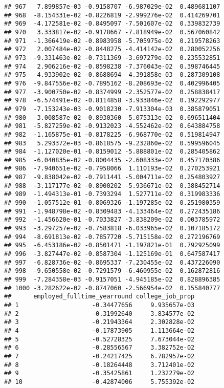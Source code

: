 \documentclass[
]{article}
\begin{document}
\begin{verbatim}
## 967   7.899857e-03 -0.9158707 -6.987029e-02  0.489681107
## 968  -8.154331e-02 -0.8226819 -2.999276e-02  0.414269701
## 969  -4.172581e-02 -0.8495097 -7.501607e-02  0.339832739
## 970   3.333817e-02 -0.9178667 -7.818949e-02  0.567060842
## 971  -1.366419e-02 -0.8983958 -5.705975e-02  0.219578263
## 972   2.007484e-02 -0.8448275 -4.414142e-02  0.280052256
## 973  -9.331463e-02 -0.7311369 -3.697279e-02  0.235532851
## 974   2.906216e-02 -0.8598238 -7.376043e-02  0.398746445
## 975  -4.933902e-02 -0.8688694  4.391858e-03  0.287309108
## 976  -9.847556e-02 -0.7895162 -8.208693e-02  0.402996405
## 977  -3.900750e-02 -0.8374999 -2.352577e-02  0.258838417
## 978  -6.574491e-02 -0.8114858 -3.933846e-02  0.192292977
## 979  -7.153243e-03 -0.9018230 -7.913304e-03  0.385879051
## 980  -3.008587e-02 -0.8930360 -5.075313e-02  0.696511404
## 981  -5.827259e-02 -0.9132023 -4.552462e-02  0.643884758
## 982  -1.165875e-01 -0.8178225 -6.968770e-02  0.519814947
## 983   5.293372e-03 -0.8618575 -9.232860e-02  0.599596045
## 984  -1.127020e-01 -0.8159012 -5.888801e-02  0.285405862
## 985  -6.040835e-02 -0.8004435 -2.608333e-02  0.457170386
## 986  -7.940651e-02 -0.7958066  1.110193e-02  0.270253921
## 987  -9.838042e-02 -0.7911441 -5.004711e-02  0.254803927
## 988  -3.117177e-02 -0.8900202 -5.936671e-02  0.388452714
## 989  -1.494313e-01 -0.7393294  1.527711e-02  0.319983336
## 990  -1.057512e-01 -0.8069326 -1.197285e-02  0.251980359
## 991  -1.948798e-02 -0.8309483 -4.133464e-02  0.272435186
## 992  -1.456620e-01 -0.7033827 -3.838209e-02  0.003785972
## 993  -3.297257e-02 -0.7583818 -6.033965e-02  0.107185172
## 994  -8.691813e-02 -0.7857720 -5.715158e-02  0.272196769
## 995  -6.453186e-02 -0.8501471 -1.197821e-01  0.792925099
## 996  -3.827447e-02 -0.8587304 -1.125169e-01  0.647587417
## 997  -6.828736e-02 -0.8695337 -7.230455e-02  0.437226090
## 998  -9.650558e-02 -0.7291579 -6.460955e-02  0.162872816
## 999  -7.284358e-03 -0.9157051 -4.945185e-02  0.828896385
## 1000 -3.282622e-02 -0.8747060 -2.566954e-02  0.155840777
##      employed_fulltime_yearround college_job_prop
## 1                    -0.34477656     9.935657e-03
## 2                    -0.31992640     3.834577e-02
## 3                    -0.21943364     2.302828e-02
## 4                    -0.17873905     1.113664e-02
## 5                    -0.52728325     7.673044e-02
## 6                    -0.28556567     3.382752e-02
## 7                    -0.24217425     6.782957e-02
## 8                    -0.18264448     3.712401e-02
## 9                    -0.35425861     1.232279e-02
## 10                   -0.42874006     5.755392e-02

\end{verbatim}
\end{document}
